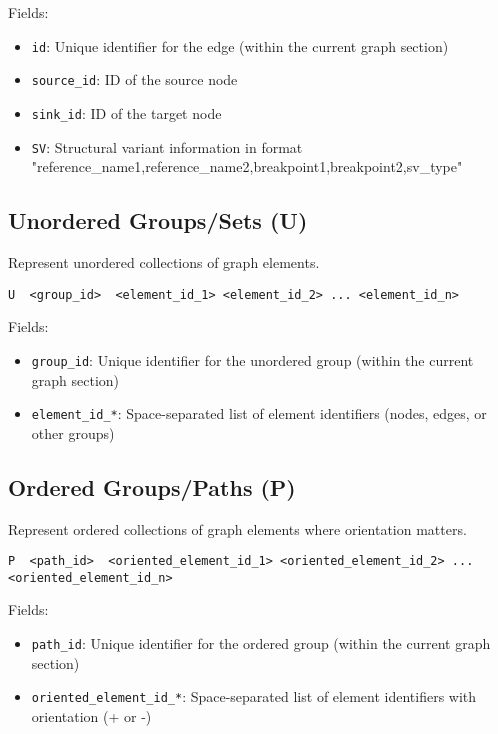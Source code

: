 \documentclass{article}
\begin{document}
Fields:
\begin{itemize}
	\item \texttt{id}: Unique identifier for the edge (within the current graph section)
	\item \texttt{source\_id}: ID of the source node
	\item \texttt{sink\_id}: ID of the target node
	\item \texttt{SV}: Structural variant information in format "reference\_name1,reference\_name2,breakpoint1,breakpoint2,sv\_type"
\end{itemize}

\subsection{Unordered Groups/Sets (U)}

Represent unordered collections of graph elements.

\begin{lstlisting}
U  <group_id>  <element_id_1> <element_id_2> ... <element_id_n>
\end{lstlisting}

Fields:
\begin{itemize}
	\item \texttt{group\_id}: Unique identifier for the unordered group (within the current graph section)
	\item \texttt{element\_id\_*}: Space-separated list of element identifiers (nodes, edges, or other groups)
\end{itemize}

\subsection{Ordered Groups/Paths (P)}

Represent ordered collections of graph elements where orientation matters.

\begin{lstlisting}
P  <path_id>  <oriented_element_id_1> <oriented_element_id_2> ... <oriented_element_id_n>
\end{lstlisting}

Fields:
\begin{itemize}
	\item \texttt{path\_id}: Unique identifier for the ordered group (within the current graph section)
	\item \texttt{oriented\_element\_id\_*}: Space-separated list of element identifiers with orientation (+ or -)
\end{itemize}
\end{document}
